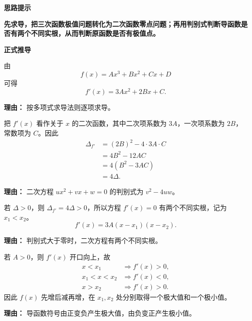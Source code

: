 \begin{proofbox}
	\textbf{\textcolor{CProof}{思路提示}}

	\textbf{先求导，把三次函数极值问题转化为二次函数零点问题；再用判别式判断导函数是否有两个不同实根，从而判断原函数是否有极值点。}

	\medskip
	\textbf{\textcolor{CProof}{正式推导}}
	\begin{description}[style=nextline, leftmargin=2.8em, labelsep=0.5em, itemsep=0.55em]
		\item[\textbf{步骤一（求导）：}]
		      由
		      \[
			      f(x)=Ax^3+Bx^2+Cx+D
		      \]
		      可得
		      \[
			      f'(x)=3Ax^2+2Bx+C.
		      \]
		      \par\textbf{理由：} 按多项式求导法则逐项求导。

		\item[\textbf{步骤二（建立判别式关系）：}]
		      把 $f'(x)$ 看作关于 $x$ 的二次函数，其中二次项系数为 $3A$，一次项系数为 $2B$，常数项为 $C$。因此
		      \[
			      \begin{aligned}
				      \Delta_{f'}
				       & =(2B)^2-4\cdot3A\cdot C \\
				       & =4B^2-12AC              \\
				       & =4(B^2-3AC)             \\
				       & =4\Delta.
			      \end{aligned}
		      \]
		      \par\textbf{理由：} 二次方程 $ux^2+vx+w=0$ 的判别式为 $v^2-4uw$。

		\item[\textbf{步骤三（$\Delta>0$ 时）：}]
		      若 $\Delta>0$，则 $\Delta_{f'}=4\Delta>0$，所以方程 $f'(x)=0$ 有两个不同实根，记为 $x_1<x_2$。
		      \[
			      f'(x)=3A(x-x_1)(x-x_2).
		      \]
		      \par\textbf{理由：} 判别式大于零时，二次方程有两个不同实根。

		\item[\textbf{步骤四（$A>0$ 的单调趋势）：}]
		      若 $A>0$，则 $f'(x)$ 开口向上，故
		      \[
			      \begin{aligned}
				      x<x_1     & \Rightarrow f'(x)>0, \\
				      x_1<x<x_2 & \Rightarrow f'(x)<0, \\
				      x>x_2     & \Rightarrow f'(x)>0.
			      \end{aligned}
		      \]
		      因此 $f(x)$ 先增后减再增，在 $x_1,x_2$ 处分别取得一个极大值和一个极小值。
		      \par\textbf{理由：} 导函数符号由正变负产生极大值，由负变正产生极小值。


\end{description}
\end{proofbox}
